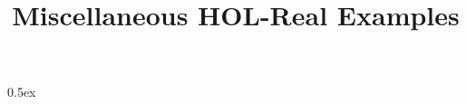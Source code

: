 \documentclass[11pt,a4paper]{article}
\begin{document}
\title{Miscellaneous HOL-Real Examples}
\maketitle

\tableofcontents

\parindent 0pt\parskip 0.5ex

\end{document}
